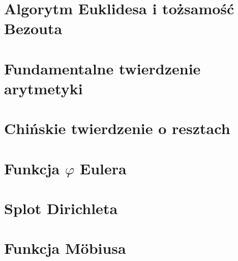\section{Algorytm Euklidesa i tożsamość Bezouta}

\section{Fundamentalne twierdzenie arytmetyki}

\section{Chińskie twierdzenie o resztach}

\section{Funkcja \texorpdfstring{$\varphi$}{phi} Eulera}

\section{Splot Dirichleta}

\section{Funkcja Möbiusa}

